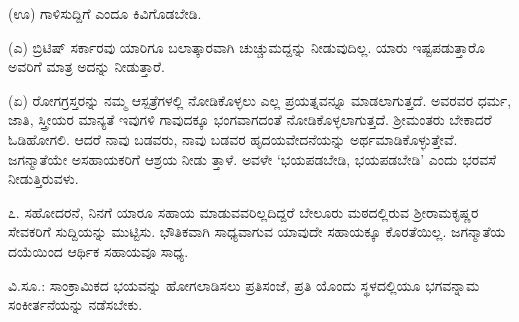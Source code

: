 (ಊ) ಗಾಳಿಸುದ್ದಿಗೆ ಎಂದೂ ಕಿವಿಗೊಡಬೇಡಿ.

(ಎ) ಬ್ರಿಟಿಷ್ ಸರ್ಕಾರವು ಯಾರಿಗೂ ಬಲಾತ್ಕಾರವಾಗಿ ಚುಚ್ಚುಮದ್ದನ್ನು ನೀಡುವುದಿಲ್ಲ. ಯಾರು ಇಷ್ಟಪಡುತ್ತಾರೊ ಅವರಿಗೆ ಮಾತ್ರ ಅದನ್ನು ನೀಡುತ್ತಾರೆ.

(ಏ) ರೋಗಗ್ರಸ್ತರನ್ನು ನಮ್ಮ ಆಸ್ಪತ್ರೆಗಳಲ್ಲಿ ನೋಡಿಕೊಳ್ಳಲು ಎಲ್ಲ ಪ್ರಯತ್ನವನ್ನೂ ಮಾಡಲಾಗುತ್ತದೆ. ಅವರವರ ಧರ್ಮ, ಜಾತಿ, ಸ್ತ್ರೀಯರ ಮಾನ್ಯತೆ ಇವುಗಳಿ ಗಾವುದಕ್ಕೂ ಭಂಗವಾಗದಂತೆ ನೋಡಿಕೊಳ್ಳಲಾಗುತ್ತದೆ. ಶ‍್ರೀಮಂತರು ಬೇಕಾದರೆ ಓಡಿಹೋಗಲಿ. ಆದರೆ ನಾವು ಬಡವರು, ನಾವು ಬಡವರ ಹೃದಯವೇದನೆಯನ್ನು ಅರ್ಥಮಾಡಿಕೊಳ್ಳುತ್ತೇವೆ. ಜಗನ್ಮಾತೆಯೇ ಅಸಹಾಯಕರಿಗೆ ಆಶ್ರಯ ನೀಡು ತ್ತಾಳೆ. ಅವಳೇ ‘ಭಯಪಡಬೇಡಿ, ಭಯಪಡಬೇಡಿ’ ಎಂದು ಭರವಸೆ ನೀಡುತ್ತಿರುವಳು.

೭. ಸಹೋದರನೆ, ನಿನಗೆ ಯಾರೂ ಸಹಾಯ ಮಾಡುವವರಿಲ್ಲದಿದ್ದರೆ ಬೇಲೂರು ಮಠದಲ್ಲಿರುವ ಶ‍್ರೀರಾಮಕೃಷ್ಣರ ಸೇವಕರಿಗೆ ಸುದ್ದಿಯನ್ನು ಮುಟ್ಟಿಸು. ಭೌತಿಕವಾಗಿ ಸಾಧ್ಯವಾಗುವ ಯಾವುದೇ ಸಹಾಯಕ್ಕೂ ಕೊರತೆಯಿಲ್ಲ. ಜಗನ್ಮಾತೆಯ ದಯೆಯಿಂದ ಆರ್ಥಿಕ ಸಹಾಯವೂ ಸಾಧ್ಯ.

ವಿ.ಸೂ.: ಸಾಂಕ್ರಾಮಿಕದ ಭಯವನ್ನು ಹೋಗಲಾಡಿಸಲು ಪ್ರತಿಸಂಜೆ, ಪ್ರತಿ ಯೊಂದು ಸ್ಥಳದಲ್ಲಿಯೂ ಭಗವನ್ನಾಮ ಸಂಕೀರ್ತನೆಯನ್ನು ನಡೆಸಬೇಕು.

